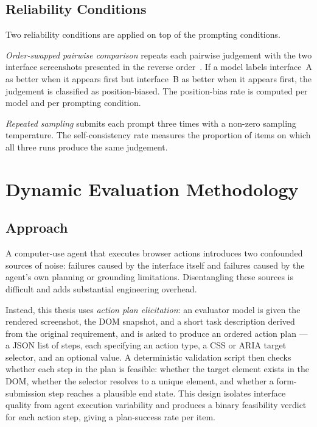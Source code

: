 \subsection{Reliability Conditions}

Two reliability conditions are applied on top of the prompting conditions.

\textit{Order-swapped pairwise comparison} repeats each pairwise
judgement with the two interface screenshots presented in the reverse
order~\cite{shi-etal-2025-judging}.
If a model labels interface~A as better when it appears first but
interface~B as better when it appears first, the judgement is
classified as position-biased.
The position-bias rate is computed per model and per prompting condition.

\textit{Repeated sampling} submits each prompt three times with a
non-zero sampling temperature.
The self-consistency rate measures the proportion of items on which
all three runs produce the same judgement.

\section{Dynamic Evaluation Methodology}
\label{sec:dynamic-method}

\subsection{Approach}

A computer-use agent that executes browser actions introduces two
confounded sources of noise: failures caused by the interface itself
and failures caused by the agent's own planning or grounding
limitations.
Disentangling these sources is difficult and adds substantial
engineering overhead.

Instead, this thesis uses \textit{action plan elicitation}:
an evaluator model is given the rendered screenshot, the DOM snapshot,
and a short task description derived from the original requirement,
and is asked to produce an ordered action plan — a JSON list of
steps, each specifying an action type, a CSS or ARIA target selector,
and an optional value.
A deterministic validation script then checks whether each step in
the plan is feasible: whether the target element exists in the DOM,
whether the selector resolves to a unique element, and whether a
form-submission step reaches a plausible end state.
This design isolates interface quality from agent execution variability
and produces a binary feasibility verdict for each action step,
giving a plan-success rate per item.

